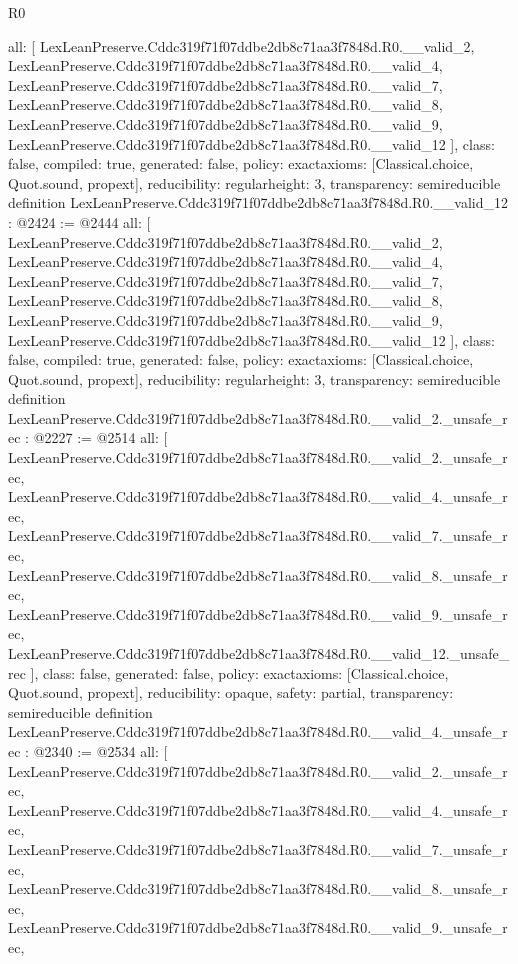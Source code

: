 \begin{lexlean}{R0}
\begin{coremodule}
{  all: [
    LexLeanPreserve.Cddc319f71f07ddbe2db8c71aa3f7848d.R0.__valid_2,
    LexLeanPreserve.Cddc319f71f07ddbe2db8c71aa3f7848d.R0.__valid_4,
    LexLeanPreserve.Cddc319f71f07ddbe2db8c71aa3f7848d.R0.__valid_7,
    LexLeanPreserve.Cddc319f71f07ddbe2db8c71aa3f7848d.R0.__valid_8,
    LexLeanPreserve.Cddc319f71f07ddbe2db8c71aa3f7848d.R0.__valid_9,
    LexLeanPreserve.Cddc319f71f07ddbe2db8c71aa3f7848d.R0.__valid_12
  ],
  class: false,
  compiled: true,
  generated: false,
  policy: exact{axioms: [Classical.choice, Quot.sound, propext]},
  reducibility: regular{height: 3},
  transparency: semireducible
}
definition LexLeanPreserve.Cddc319f71f07ddbe2db8c71aa3f7848d.R0.__valid_12 : @2424 := @2444 {
  all: [
    LexLeanPreserve.Cddc319f71f07ddbe2db8c71aa3f7848d.R0.__valid_2,
    LexLeanPreserve.Cddc319f71f07ddbe2db8c71aa3f7848d.R0.__valid_4,
    LexLeanPreserve.Cddc319f71f07ddbe2db8c71aa3f7848d.R0.__valid_7,
    LexLeanPreserve.Cddc319f71f07ddbe2db8c71aa3f7848d.R0.__valid_8,
    LexLeanPreserve.Cddc319f71f07ddbe2db8c71aa3f7848d.R0.__valid_9,
    LexLeanPreserve.Cddc319f71f07ddbe2db8c71aa3f7848d.R0.__valid_12
  ],
  class: false,
  compiled: true,
  generated: false,
  policy: exact{axioms: [Classical.choice, Quot.sound, propext]},
  reducibility: regular{height: 3},
  transparency: semireducible
}
definition LexLeanPreserve.Cddc319f71f07ddbe2db8c71aa3f7848d.R0.__valid_2._unsafe_rec : @2227 := @2514 {
  all: [
    LexLeanPreserve.Cddc319f71f07ddbe2db8c71aa3f7848d.R0.__valid_2._unsafe_rec,
    LexLeanPreserve.Cddc319f71f07ddbe2db8c71aa3f7848d.R0.__valid_4._unsafe_rec,
    LexLeanPreserve.Cddc319f71f07ddbe2db8c71aa3f7848d.R0.__valid_7._unsafe_rec,
    LexLeanPreserve.Cddc319f71f07ddbe2db8c71aa3f7848d.R0.__valid_8._unsafe_rec,
    LexLeanPreserve.Cddc319f71f07ddbe2db8c71aa3f7848d.R0.__valid_9._unsafe_rec,
    LexLeanPreserve.Cddc319f71f07ddbe2db8c71aa3f7848d.R0.__valid_12._unsafe_rec
  ],
  class: false,
  generated: false,
  policy: exact{axioms: [Classical.choice, Quot.sound, propext]},
  reducibility: opaque{},
  safety: partial,
  transparency: semireducible
}
definition LexLeanPreserve.Cddc319f71f07ddbe2db8c71aa3f7848d.R0.__valid_4._unsafe_rec : @2340 := @2534 {
  all: [
    LexLeanPreserve.Cddc319f71f07ddbe2db8c71aa3f7848d.R0.__valid_2._unsafe_rec,
    LexLeanPreserve.Cddc319f71f07ddbe2db8c71aa3f7848d.R0.__valid_4._unsafe_rec,
    LexLeanPreserve.Cddc319f71f07ddbe2db8c71aa3f7848d.R0.__valid_7._unsafe_rec,
    LexLeanPreserve.Cddc319f71f07ddbe2db8c71aa3f7848d.R0.__valid_8._unsafe_rec,
    LexLeanPreserve.Cddc319f71f07ddbe2db8c71aa3f7848d.R0.__valid_9._unsafe_rec,
}
\end{coremodule}
\end{lexlean}
